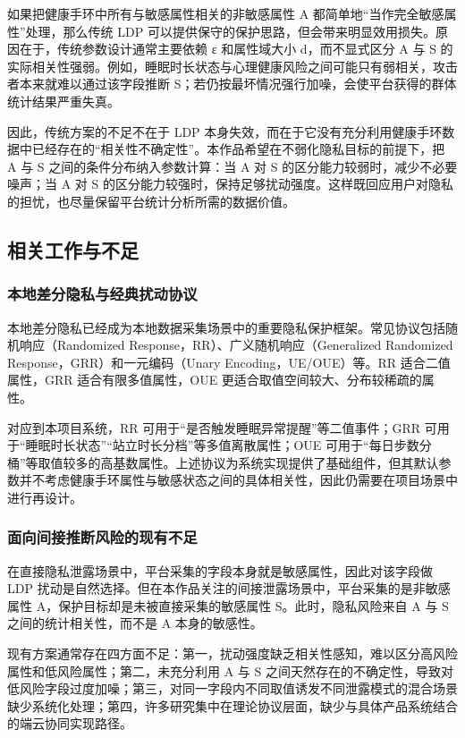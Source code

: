 \documentclass{cumcmthesis}
\numberwithin{equation}{section}
\numberwithin{figure}{section}
\numberwithin{table}{section}
\begin{document}
如果把健康手环中所有与敏感属性相关的非敏感属性 A 都简单地“当作完全敏感属性”处理，那么传统 LDP 可以提供保守的保护思路，但会带来明显效用损失。原因在于，传统参数设计通常主要依赖 ε 和属性域大小 d，而不显式区分 A 与 S 的实际相关性强弱。例如，睡眠时长状态与心理健康风险之间可能只有弱相关，攻击者本来就难以通过该字段推断 S；若仍按最坏情况强行加噪，会使平台获得的群体统计结果严重失真。

因此，传统方案的不足不在于 LDP 本身失效，而在于它没有充分利用健康手环数据中已经存在的“相关性不确定性”。本作品希望在不弱化隐私目标的前提下，把 A 与 S 之间的条件分布纳入参数计算：当 A 对 S 的区分能力较弱时，减少不必要噪声；当 A 对 S 的区分能力较强时，保持足够扰动强度。这样既回应用户对隐私的担忧，也尽量保留平台统计分析所需的数据价值。

\subsection{相关工作与不足}

\subsubsection{本地差分隐私与经典扰动协议}

本地差分隐私已经成为本地数据采集场景中的重要隐私保护框架。常见协议包括随机响应（Randomized Response，RR）、广义随机响应（Generalized Randomized Response，GRR）和一元编码（Unary Encoding，UE/OUE）等。RR 适合二值属性，GRR 适合有限多值属性，OUE 更适合取值空间较大、分布较稀疏的属性。

对应到本项目系统，RR 可用于“是否触发睡眠异常提醒”等二值事件；GRR 可用于“睡眠时长状态”“站立时长分档”等多值离散属性；OUE 可用于“每日步数分桶”等取值较多的高基数属性。上述协议为系统实现提供了基础组件，但其默认参数并不考虑健康手环属性与敏感状态之间的具体相关性，因此仍需要在项目场景中进行再设计。

\subsubsection{面向间接推断风险的现有不足}

在直接隐私泄露场景中，平台采集的字段本身就是敏感属性，因此对该字段做 LDP 扰动是自然选择。但在本作品关注的间接泄露场景中，平台采集的是非敏感属性 A，保护目标却是未被直接采集的敏感属性 S。此时，隐私风险来自 A 与 S 之间的统计相关性，而不是 A 本身的敏感性。

现有方案通常存在四方面不足：第一，扰动强度缺乏相关性感知，难以区分高风险属性和低风险属性；第二，未充分利用 A 与 S 之间天然存在的不确定性，导致对低风险字段过度加噪；第三，对同一字段内不同取值诱发不同泄露模式的混合场景缺少系统化处理；第四，许多研究集中在理论协议层面，缺少与具体产品系统结合的端云协同实现路径。
\end{document}
